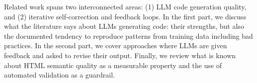 




Related work spans two interconnected areas: (1) LLM code generation quality, and (2) iterative self-correction and feedback loops. In the first part, we discuss what the literature says about LLMs generating code: their strengths, but also the documented tendency to reproduce patterns from training data including bad practices. In the second part, we cover approaches where LLMs are given feedback and asked to revise their output. Finally, we review what is known about HTML semantic quality as a measurable property and the use of automated validation as a guardrail.



